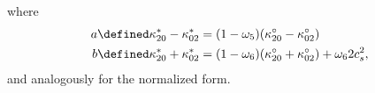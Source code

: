 where
\begin{equation}
 \begin{aligned}
   a \defined \kappa_{20}^{*} - \kappa_{02}^{*}
     & = (1-\omega_5) (\kappa_{20}^{\circ}- \kappa_{02}^{\circ}) \\
   b \defined \kappa_{20}^{*} + \kappa_{02}^{*}
     & = (1-\omega_6)(\kappa_{20}^{\circ} + \kappa_{02}^{\circ}) + \omega_6 2 c_s^2,
 \end{aligned}
\end{equation}
and analogously for the normalized form.
